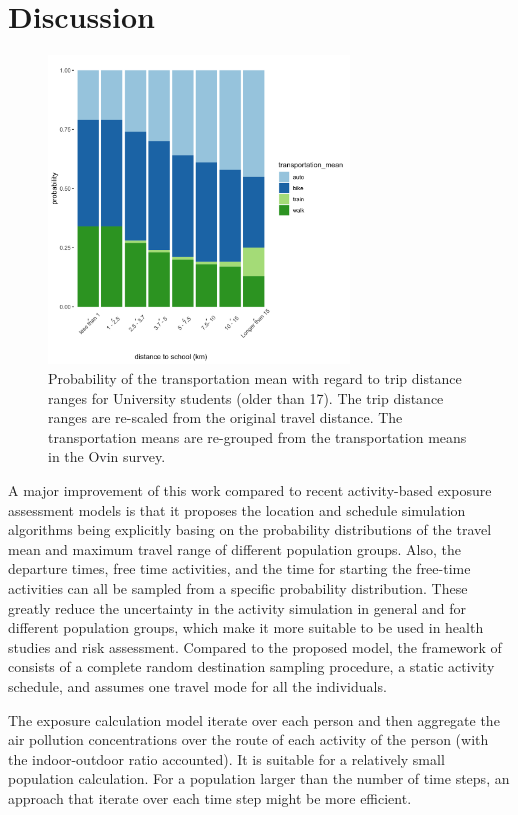 \documentclass[]{article}
\begin{document}
\section{Discussion}
\label{sec:dis}

\begin{figure}[!h]
    \centering
    \includegraphics[width=8cm]{figure/ditance_vs_transmean_Uni.png}
    \caption{Probability of the transportation mean with regard to trip distance ranges for University students (older than 17). The trip distance ranges are re-scaled from the original travel distance. The transportation means are re-grouped from the transportation means in the Ovin survey.}
    \label{Uni_mode_dist}
\end{figure}

A major improvement of this work compared to recent activity-based exposure assessment models \citep{lu2019activity} is that it proposes the location and schedule simulation algorithms being explicitly basing on the probability distributions of the travel mean and maximum travel range of different population groups. Also, the departure times, free time activities, and the time for starting the free-time activities can all be sampled from a specific probability distribution. These greatly reduce the uncertainty in the activity simulation in general and for different population groups, which make it more suitable to be used in health studies and risk assessment. Compared to the proposed model, the framework of \citep{lu2019activity} consists of a complete random destination sampling procedure, a static activity schedule, and assumes one travel mode for all the individuals. 


The exposure calculation model iterate over each person and then aggregate the air pollution concentrations over the route of each activity of the person (with the indoor-outdoor ratio accounted). It is suitable for a relatively small population calculation. For a population larger than the number of time steps, an approach that iterate over each time step might be more efficient.  
\end{document}
